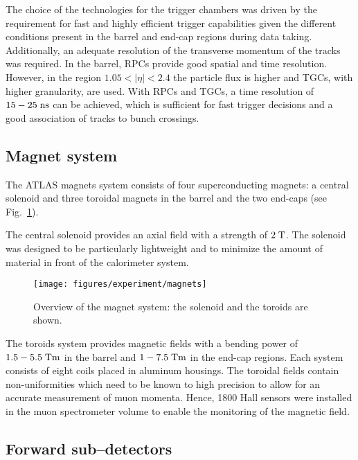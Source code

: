 The choice of the technologies for the trigger chambers was driven 
by the requirement for fast and highly efficient trigger capabilities
given the different conditions present in the barrel and end-cap
regions during data taking. 
Additionally, an adequate resolution of the transverse momentum of the
tracks was required. 
In the barrel, RPCs provide good spatial and time resolution.
However, in the region \mbox{$1.05 < |\eta| < 2.4$}  the particle flux
is higher and TGCs, with higher granularity, are used.
With RPCs and TGCs, a time resolution of \mbox{$15 - 25 \; \mathrm{ns}$} can be
achieved, 
which is sufficient for fast trigger decisions and a good association of
tracks to bunch crossings.

\subsection{Magnet system}
\label{sec:magnets}

The ATLAS magnets system consists of four superconducting
magnets: a central solenoid and three toroidal magnets in the barrel and the
two end-caps (see Fig.~\ref{fig:magnets}).

The central solenoid provides an axial field with a strength of \mbox{$2 \; \mathrm{T}$}.
The solenoid was designed to be particularly lightweight and to
minimize the amount of material in front of the calorimeter system.

\begin{figure}[ht]
\begin{center}
\texttt{[image: figures/experiment/magnets]}
\caption[Overview of the magnet system]{
  Overview of the magnet system:
  the solenoid and the toroids are shown.}
\label{fig:magnets}
\end{center}
\end{figure}

The toroids system provides magnetic fields with a bending power
of \mbox{$1.5 - 5.5 \; \mathrm{Tm}$} in the barrel and \mbox{$1 - 7.5 \; \mathrm{Tm}$} in the end-cap regions.
Each system consists of eight coils placed in aluminum housings.
The toroidal fields contain non-uniformities which need to be known to
high precision to allow for an accurate measurement of muon momenta.
Hence, 1800 Hall sensors were installed in the muon spectrometer 
volume to enable the monitoring of the magnetic field.

\subsection{Forward sub--detectors}
\label{sec:forward}

